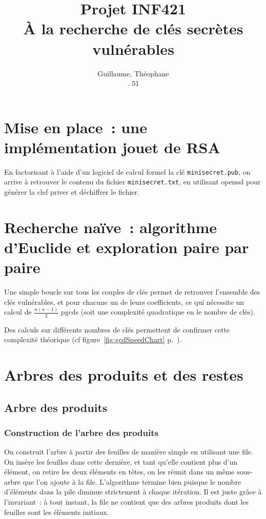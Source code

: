\documentclass[a4paper,10pt]{article}
\title{Projet INF421 \\ À la recherche de clés secrètes vulnérables}
\author{\bsc{Hétier} Guillaume, \bsc{Hufschmitt} Théophane \\ \bsc{Gr}. 51}
\begin{document}
\maketitle

\section{Mise en place~: une implémentation jouet de RSA}
En factorisant à l'aide d'un logiciel de calcul formel la clé \texttt{minisecret.pub}, on arrive à retrouver le contenu du fichier \texttt{minisecret.txt}, en utilisant openssl pour générer la clef priver et déchiffrer le fichier.


\section{Recherche naïve~: algorithme d'Euclide et exploration paire par paire}
Une simple boucle sur tous les couples de clés permet de retrouver l'ensemble des clés vulnérables, et pour chacune un de leurs coefficients, ce qui nécessite un calcul de $\frac{n(n-1)}{2}$ pgcds (soit une complexité quadratique en le nombre de clés).

Des calculs sur différents nombres de clés permettent de confirmer cette complexité théorique (cf figure~\ref{fig:gcdSpeedChart} p.~\pageref{fig:gcdSpeedChart}).
  
  
\section{Arbres des produits et des restes}

  \subsection{Arbre des produits}
  \subsubsection{Construction de l'arbre des produits}
  On construit l'arbre à partir des feuilles de manière simple en utilisant une file. On insère les feuilles dans cette dernière, et tant qu'elle contient plus d'un élément, on retire les deux éléments en têtes, on les réunit dans un même sous-arbre que l'on ajoute à la file.
  L'algorithme termine bien puisque le nombre d'éléments dans la pile diminue strictement à chaque itération. Il est juste grâce à l'invariant~: à tout instant, la file ne contient que des arbres produits dont les feuilles sont les éléments initiaux.
  
\end{document}
